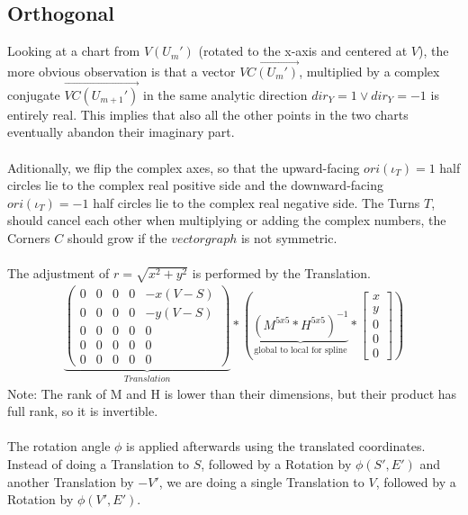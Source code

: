 \documentclass{report}
\begin{document}
\subsection{Orthogonal}
Looking at a chart from $V(U_{m}')$ (rotated to the x-axis and centered at $V$), the more obvious observation is that a vector $\overrightarrow{VC(U_{m}')}$, multiplied by a complex conjugate $\overrightarrow{VC(U_{m+1}')}$ in the same analytic direction $dir_{Y}=1\lor dir_{Y}=-1$ is entirely real. This implies that also all the other points in the two charts eventually abandon their imaginary part.\\\\
Aditionally, we flip the complex axes, so that the upward-facing $ori(\iota_{T})=1$ half circles lie to the complex real positive side and the downward-facing $ori(\iota_{T})=-1$ half circles lie to the complex real negative side. The Turns $T$, should cancel each other when multiplying or adding the complex numbers, the Corners $C$ should grow if the $vectorgraph$ is not symmetric.\\\\
The adjustment of $r=\sqrt{x^2+y^2}$ is performed by the Translation. 
\begin{align}
\underbrace{
\begin{pmatrix}
0 & 0 & 0 & 0 & -x(V-S) \\
0 & 0 & 0 & 0 & -y(V-S) \\
0 & 0 & 0 & 0 & 0 \\
0 & 0 & 0 & 0 & 0 \\
0 & 0 & 0 & 0 & 0
\end{pmatrix}
}_{Translation}
*(
\underbrace{
(M^{5x5} * H^{5x5})^{-1}
}_{\text{global to local for spline}}
*\begin{bmatrix} x \\ y \\ 0 \\ 0 \\ 0 \end{bmatrix})
\end{align}
Note: The rank of M and H is lower than their dimensions, but their product has full rank, so it is invertible.\\\\
The rotation angle $\phi$ is applied afterwards using the translated coordinates. Instead of doing a Translation to $S$, followed by a Rotation by $\phi(S',E')$ and another Translation by $-V'$, we are doing a single Translation to $V$, followed by a Rotation by $\phi(V',E')$.\\
\end{document}

